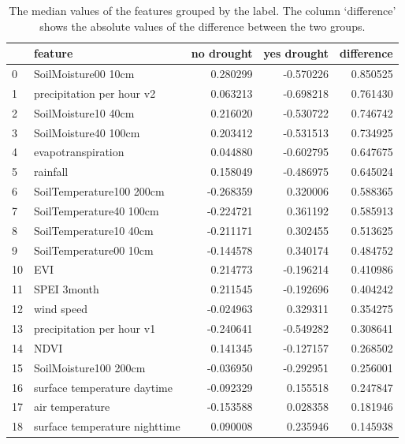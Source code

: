 \documentclass[10pt,parskip=half,
toc=sectionentrywithdots,
bibliography=totocnumbered,
captions=tableheading,numbers=noendperiod]{scrartcl}
\begin{document}
\begin{table}[H]
\caption{The median values of the features grouped by the label. The column
`difference' shows the absolute values of the difference between the two
groups.}\label{tlabe_median}
\centering
\begin{adjustbox}{max width=\textwidth}
\begin{tabular}{llrrr}
\toprule
{} &                        feature &  no drought &  yes drought &  difference \\
\midrule
0  &            SoilMoisture00 10cm &    0.280299 &    -0.570226 &    0.850525 \\
1  &      precipitation per hour v2 &    0.063213 &    -0.698218 &    0.761430 \\
2  &            SoilMoisture10 40cm &    0.216020 &    -0.530722 &    0.746742 \\
3  &           SoilMoisture40 100cm &    0.203412 &    -0.531513 &    0.734925 \\
4  &             evapotranspiration &    0.044880 &    -0.602795 &    0.647675 \\
5  &                       rainfall &    0.158049 &    -0.486975 &    0.645024 \\
6  &       SoilTemperature100 200cm &   -0.268359 &     0.320006 &    0.588365 \\
7  &        SoilTemperature40 100cm &   -0.224721 &     0.361192 &    0.585913 \\
8  &         SoilTemperature10 40cm &   -0.211171 &     0.302455 &    0.513625 \\
9  &         SoilTemperature00 10cm &   -0.144578 &     0.340174 &    0.484752 \\
10 &                            EVI &    0.214773 &    -0.196214 &    0.410986 \\
11 &                    SPEI 3month &    0.211545 &    -0.192696 &    0.404242 \\
12 &                     wind speed &   -0.024963 &     0.329311 &    0.354275 \\
13 &      precipitation per hour v1 &   -0.240641 &    -0.549282 &    0.308641 \\
14 &                           NDVI &    0.141345 &    -0.127157 &    0.268502 \\
15 &          SoilMoisture100 200cm &   -0.036950 &    -0.292951 &    0.256001 \\
16 &    surface temperature daytime &   -0.092329 &     0.155518 &    0.247847 \\
17 &                air temperature &   -0.153588 &     0.028358 &    0.181946 \\
18 &  surface temperature nighttime &    0.090008 &     0.235946 &    0.145938 \\
\bottomrule
\end{tabular}

\end{adjustbox}
\end{table}
\end{document}
